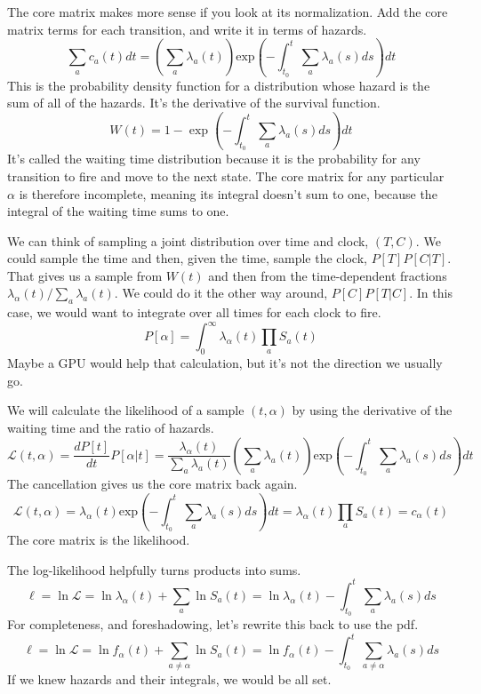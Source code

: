 \documentclass{article}
\begin{document}
The core matrix makes more sense if you look at its normalization. Add the core matrix terms for each transition, and write it in terms of hazards.
\begin{equation}
	\sum_a c_a(t)dt = \left(\sum_a \lambda_a(t)\right)\mbox{exp}\left(-\int_{t_0}^t\sum_a \lambda_a(s)ds \right)dt
\end{equation}
This is the probability density function for a distribution whose hazard is the sum of all of the hazards. It's the derivative of the survival function.
\begin{equation}
W(t) = 1-\exp\left(-\int_{t_0}^t\sum_a \lambda_a(s)ds \right)dt
\end{equation}
It's called the waiting time distribution because it is the probability for any transition to fire and move to the next state. The core matrix for any particular $\alpha$ is therefore incomplete, meaning its integral doesn't sum to one, because the integral of the waiting time sums to one.

We can think of sampling a joint distribution over time and clock, $(T,C)$. We could sample the time and then, given the time, sample the clock, $P[T]P[C|T]$. That gives us a sample from $W(t)$ and then from the time-dependent fractions $\lambda_\alpha(t)/\sum_a \lambda_a(t)$. We could do it the other way around, $P[C]P[T|C]$. In this case, we would want to integrate over all times for each clock to fire.
\begin{equation}
  P[\alpha] = \int_0^\infty \lambda_\alpha(t)\prod_a S_a(t)
\end{equation}
Maybe a GPU would help that calculation, but it's not the direction we usually go.

We will calculate the likelihood of a sample $(t,\alpha)$ by using the derivative of the waiting time and the ratio of hazards.
\begin{equation}
{\mathcal L(t,\alpha)}=\frac{dP[t]}{dt}P[\alpha|t]=\frac{\lambda_{\alpha}(t)}{\sum_a \lambda_a(t)}\left(\sum_a \lambda_a(t)\right)\mbox{exp}\left(-\int_{t_0}^t\sum_a \lambda_a(s)ds \right)dt
\end{equation}
The cancellation gives us the core matrix back again.
\begin{equation}
{\mathcal L(t,\alpha)}=\lambda_{\alpha}(t)\mbox{exp}\left(-\int_{t_0}^t\sum_a \lambda_a(s)ds \right)dt=\lambda_{\alpha}(t)\prod_{a}S_a(t)=c_\alpha(t)
\end{equation}
The core matrix is the likelihood.

The log-likelihood helpfully turns products into sums.
\begin{equation}
\ell = \ln {\mathcal L} = \ln \lambda_\alpha(t) + \sum_a \ln S_a(t) = \ln \lambda_\alpha(t)-\int_{t_0}^t\sum_a \lambda_a(s)ds
\end{equation}
For completeness, and foreshadowing, let's rewrite this back to use the pdf.
\begin{equation}
\ell = \ln {\mathcal L} = \ln f_\alpha(t) + \sum_{a\ne\alpha} \ln S_a(t) = \ln f_\alpha(t)-\int_{t_0}^t\sum_{a\ne\alpha} \lambda_a(s)ds
\end{equation}
If we knew hazards and their integrals, we would be all set.
\end{document}

